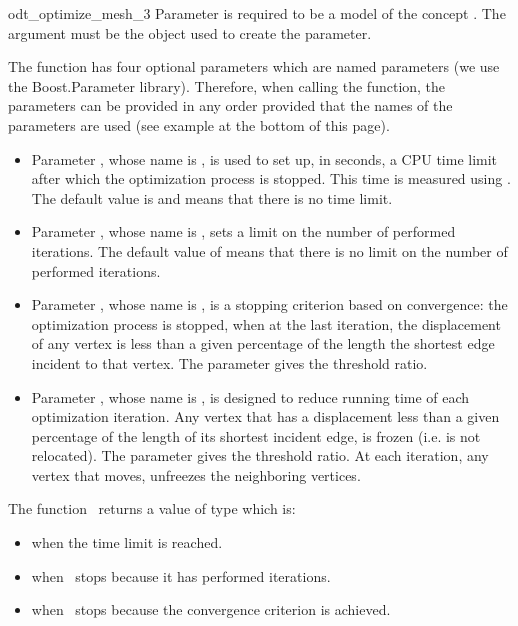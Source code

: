 \begin{ccRefFunction}{odt_optimize_mesh_3}
Parameter  is required to be a model of the concept
. The argument  must be the 
object used to create the  parameter.

The function has four optional parameters which are named parameters
 (we use the Boost.Parameter library). 
Therefore, when calling the function,  the parameters can be provided in any order 
provided that the names of the parameters are used
 (see example at the bottom of this page).
\begin{itemize}
\item
Parameter , whose name is ,
 is used to set up, in seconds,
 a CPU time limit after which the optimization process is stopped. This time is
 measured using .
The default value is  and means that there is no time limit.
\item  Parameter , whose name is 
 , sets a limit on the
number of performed  iterations. The default value of  means that there is 
no limit on the number of performed iterations.
\item  Parameter , whose name is 
 , is a stopping  criterion based on convergence: 
the optimization process is stopped, when at the last iteration,
the displacement of any vertex is less than a given percentage of the length
the shortest edge incident to that vertex.
The parameter  gives the threshold ratio.
\item 
Parameter , whose name is ,
is designed to reduce running time of each optimization iteration.
 Any vertex that has
a displacement less than a given percentage of the  length of its shortest incident edge,  is frozen (i.e. is
not relocated). The parameter  gives the threshold ratio. At each iteration, any vertex that
moves, unfreezes the neighboring vertices.
\end{itemize}

The function \ccRefName\ returns a value of type 
which is:
\begin{itemize}
\item {} when the time limit is reached.
\item {} when \ccRefName\ stops because it has performed  iterations.
\item {} when \ccRefName\ stops because the convergence criterion
is achieved.
\end{itemize}





\end{ccRefFunction}
